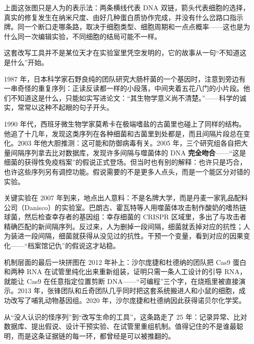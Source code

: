 \begin{center}
\end{center}

上面这张图只是人为的表示法：两条横线代表 DNA 双链，箭头代表细胞的选择，真实的修复发生在纳米尺度、由好几种蛋白质协作完成，并没有什么岔路口指示牌。同一个断口走哪条路，取决于细胞类型、细胞周期和一点点概率——这也是为什么同一次编辑实验，不同细胞的结局可能不一样。

\begin{zhengju}
这套改写工具并不是某位天才在实验室里凭空发明的，它的故事从一句“不知道这是什么”开始。

1987 年，日本科学家石野良纯的团队研究大肠杆菌的一个基因时，注意到旁边有一串奇怪的重复序列：正读反读都一样的小段落，中间夹着五花八门的小片段。他们不知道这是什么，只能如实写进论文：“其生物学意义尚不清楚。”——科学的诚实，常常以这种不起眼的句子开头。

1990 年代，西班牙微生物学家莫希卡在极端嗜盐的古菌里也碰上了同样的结构。他追了十几年，发现这类序列在各种细菌和古菌里到处都是，而且间隔片段总在变化。2003 年他大胆推测：这可能和防御病毒有关。2005 年，三个研究组各自把大量间隔序列拿去比对数据库，发现许多间隔与噬菌体的 DNA \textbf{完全吻合}——“这是细菌的获得性免疫档案”的假说正式登场。但当时也有别的解释：也许只是巧合，也许这些序列另有调控功能。假说需要的不是更多人点头，而是一个能区分对错的实验。

关键实验在 2007 年到来，地点出人意料：不是名牌大学，而是丹麦一家乳品配料公司（Danisco）的实验室。巴朗古、霍瓦特等人用噬菌体攻击制作酸奶的嗜热链球菌，然后检查幸存者的基因组：幸存细菌的 CRISPR 区域里，多出了与攻击者精确匹配的新间隔序列。反过来，人为删掉一段间隔，细菌就丢掉对应的抗性；人为装进一段间隔，细菌就获得从没见过的抗性。干预一个变量，看到对应的因果变化——“档案馆记仇”的假说这才站稳。

机制层面的最后一块拼图在 2012 年补上：沙尔庞捷和杜德纳的团队把 Cas9 蛋白和两种 RNA 在试管里纯化出来重新组装，证明只需一条人工设计的引导 RNA，就能让 Cas9 在任意指定位置剪断 DNA——“可编程”三个字，在烧瓶里被直接演示。2013 年，张锋团队和丘奇团队几乎同时把这套系统搬进人和小鼠的细胞，成功改写了哺乳动物基因组。2020 年，沙尔庞捷和杜德纳因此获得诺贝尔化学奖。

从“没人认识的怪序列”到“改写生命的工具”，这条路走了 25 年：记录异常、比对数据库、提出假说、设计干预实验、在试管里重组机制。值得记住的不是谁最聪明，而是这条证据链的每一环，都曾经是可以被推翻的。
\end{zhengju}

